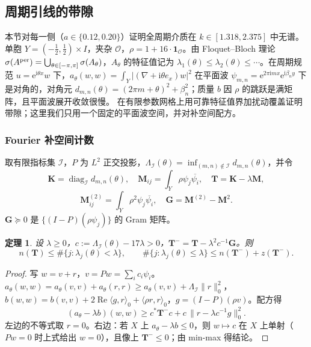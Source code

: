 \documentclass[11pt,a4paper,fontset=fandol]{ctexart}
\newcommand{\ii}{\mathrm{i}}
\newcommand{\ee}{\mathrm{e}}
\theoremstyle{plain}
\newtheorem{theorem}{定理}[section]
\theoremstyle{definition}
\theoremstyle{remark}
\begin{document}
\subsection{周期引线的带隙}
\label{sec:band}
本节对每一侧（$a\in\{0.12,0.20\}$）证明全周期介质在 $k\in[1.318,2.375]$ 中无谱。单胞 $Y=(-\frac12,\frac12)\times I$，夹杂 $\mathcal O$，$\rho=1+16\cdot\mathbf 1_{\mathcal O}$。由 Floquet--Bloch 理论 $\sigma(A^{\rm per})=\bigcup_{\theta\in[-\pi,\pi]}\sigma(A_\theta)$，$A_\theta$ 的特征值记为 $\lambda_1(\theta)\le\lambda_2(\theta)\le\cdots$。在周期规范 $u=\ee^{\ii\theta x}w$ 下，$a_\theta(w,w)=\int_Y|(\nabla+\ii\theta e_x)w|^2$ 在平面波 $\psi_{m,n}=\ee^{2\pi\ii mx}\ee^{\ii\beta_ny}$ 下是对角的，对角元 $d_{m,n}(\theta)=(2\pi m+\theta)^2+\beta_n^2$；质量 $b$ 因 $\rho$ 的跳跃是满矩阵，且平面波展开收敛很慢。\cite{HoangPlumWieners2009} 在有限参数网格上用可靠特征值界加扰动覆盖证明带隙；这里我们只用一个固定的平面波空间，并对补空间配方。

\subsubsection{Fourier 补空间计数}

取有限指标集 $\mathcal I$，$P$ 为 $L^2$ 正交投影，$\Lambda_{\mathcal I}(\theta)=\inf_{(m,n)\notin\mathcal I}d_{m,n}(\theta)$，并令
\[
\bm K=\operatorname{diag}_{\mathcal I}d_{m,n}(\theta),\quad\bm M_{ij}=\int_Y\rho\psi_j\overline{\psi_i},\quad\bm T=\bm K-\lambda\bm M,\]\[\bm M^{(2)}_{ij}=\int_Y\rho^2\psi_j\overline{\psi_i},\quad\bm G=\bm M^{(2)}-\bm M^2 .
\]
$\bm G\succeq0$ 是 $\{(I-P)(\rho\psi_j)\}$ 的 Gram 矩阵。

\begin{theorem}
\label{thm:fourier-count}
设 $\lambda\ge0$，$c:=\Lambda_{\mathcal I}(\theta)-17\lambda>0$，$\bm T^-=\bm T-\lambda^2c^{-1}\bm G$。则
\[
n(\bm T)\le\#\{j:\lambda_j(\theta)<\lambda\},\qquad\#\{j:\lambda_j(\theta)\le\lambda\}\le n(\bm T^-)+z(\bm T^-).
\]
\end{theorem}

\begin{proof}
写 $w=v+r$，$v=Pw=\sum_ic_i\psi_i$。$a_\theta(w,w)=a_\theta(v,v)+a_\theta(r,r)\ge a_\theta(v,v)+\Lambda_{\mathcal I}\|r\|_0^2$，$b(w,w)=b(v,v)+2\operatorname{Re}\langle g,r\rangle_0+\langle\rho r,r\rangle_0$，$g=(I-P)(\rho v)$。配方得
\[
(a_\theta-\lambda b)(w,w)\ge c^*\bm T^-c+c\,\|r-\lambda c^{-1}g\|_0^2 .
\]
左边的不等式取 $r=0$。右边：若 $X$ 上 $a_\theta-\lambda b\le0$，则 $w\mapsto c$ 在 $X$ 上单射（$Pw=0$ 时上式给出 $w=0$），且像上 $\bm T^-\le0$；由 min-max 得结论。
\end{proof}
\end{document}
